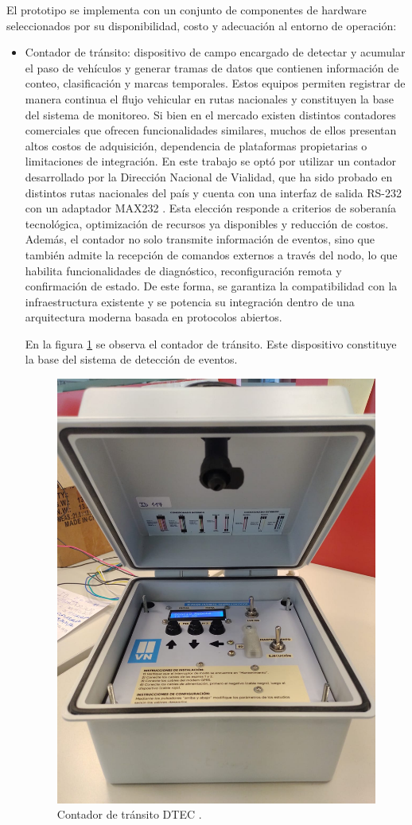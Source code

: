 El prototipo se implementa con un conjunto de componentes de hardware seleccionados por su disponibilidad, costo y adecuación al entorno de operación:

\begin{itemize}

\item  Contador de tránsito: dispositivo de campo encargado de detectar y acumular el paso de vehículos y generar tramas de datos que contienen información de conteo, clasificación y marcas temporales. Estos equipos permiten registrar de manera continua el flujo vehicular en rutas nacionales y constituyen la base del sistema de monitoreo. Si bien en el mercado existen distintos contadores comerciales que ofrecen funcionalidades similares, muchos de ellos presentan altos costos de adquisición, dependencia de plataformas propietarias o limitaciones de integración. En este trabajo se optó por utilizar un contador desarrollado por la Dirección Nacional de Vialidad, que ha sido probado en distintos rutas nacionales del país y cuenta con una interfaz de salida RS-232 \cite{tiRS232} con un adaptador MAX232 \cite{max232}. Esta elección responde a criterios de soberanía tecnológica, optimización de recursos ya disponibles y reducción de costos. Además, el contador no solo transmite información de eventos, sino que también admite la recepción de comandos externos a través del nodo, lo que habilita funcionalidades de diagnóstico, reconfiguración remota y confirmación de estado. De este forma, se garantiza la compatibilidad con la infraestructura existente y se potencia su integración dentro de una arquitectura moderna basada en protocolos abiertos.

En la figura \ref{fig:foto_dtec2} se observa el contador de tránsito. Este dispositivo constituye la base del sistema de detección de eventos. 

\begin{figure}[H]
  \centering
  \includegraphics[width=0.4\linewidth]{./Figures/fotoDTEC2.jpeg}
  \caption{Contador de tránsito DTEC \protect\footnotemark.}
  \label{fig:foto_dtec2}
\end{figure}


\end{itemize}
